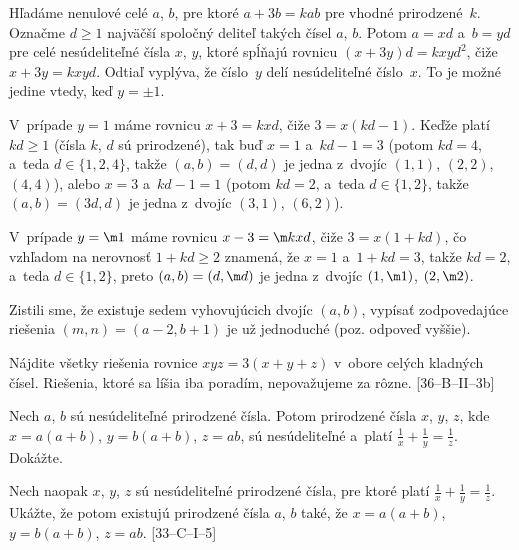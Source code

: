 {\ineriesenie
Hľadáme nenulové celé $a$, $b$, pre ktoré $a+3b=kab$ pre vhodné prirodzené~$k$. Označme $d\ge1$ najväčší spoločný deliteľ takých čísel $a$, $b$. Potom $a=xd$ a~$b=yd$ pre celé nesúdeliteľné čísla $x$, $y$, ktoré spĺňajú rovnicu $(x+3y)d=kxyd^2$, čiže $x+3y=kxyd$. Odtiaľ vyplýva, že číslo~$y$ delí nesúdeliteľné číslo~$x$. To je možné jedine vtedy, keď $y=\pm1$.

V~prípade $y=1$ máme rovnicu $x+3=kxd$, čiže $3=x(kd-1)$. Keďže platí $kd\ge1$ (čísla $k$, $d$ sú prirodzené), tak buď $x=1$ a~$kd-1=3$ (potom $kd=4$, a~teda $d\in\{1,2,4\}$, takže $(a,b)=(d,d)$ je jedna z~dvojíc $(1,1)$, $(2,2)$, $(4,4)$), alebo $x=3$ a~$kd-1=1$ (potom $kd=2$, a~teda $d\in\{1,2\}$, takže $(a,b)=(3d,d)$ je jedna z~dvojíc $(3,1)$, $(6,2)$).

V~prípade $y=\m1$ máme rovnicu $x-3=\m kxd$, čiže $3=x(1+kd)$, čo vzhľadom na nerovnosť $1+kd\ge2$ znamená, že $x=1$ a~$1+kd=3$, takže $kd=2$, a~teda $d\in\{1,2\}$, preto $(a,b)=(d,\m d)$ je jedna z~dvojíc $(1,\m1)$, $(2,\m2)$.

Zistili sme, že existuje sedem vyhovujúcich dvojíc $(a,b)$, vypísať zodpovedajúce riešenia $(m,n)=(a-2,b+1)$ je už jednoduché (poz. odpoveď vyššie).

Nájdite všetky riešenia rovnice $xyz=3(x+y+z)$ v~obore celých kladných čísel. Riešenia, ktoré sa líšia iba poradím, nepovažujeme za rôzne. [36--B--II--3b]

Nech $a$, $b$ sú nesúdeliteľné prirodzené čísla. Potom prirodzené čísla $x$, $y$, $z$, kde $x=a(a+b)$, $y=b(a+b)$, $z=ab$, sú nesúdeliteľné a~platí $\frac1x+\frac1y=\frac1z$. Dokážte.

Nech naopak $x$, $y$, $z$ sú nesúdeliteľné prirodzené čísla, pre ktoré platí $\frac1x+\frac1y=\frac1z$. Ukážte, že potom existujú prirodzené čísla $a$, $b$ také, že $x=a(a+b)$, $y=b(a+b)$, $z=ab$.
[33--C--I--5]
}

